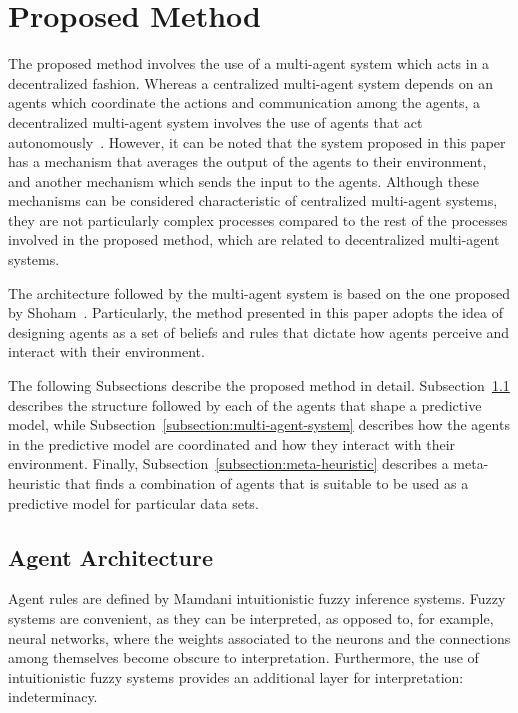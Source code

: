 \documentclass{ieeeaccess}
\begin{document}

\section{Proposed Method}
\label{section:proposed-method}

The proposed method involves the use of a multi-agent system which acts in a
decentralized fashion. Whereas a centralized multi-agent system depends on an
agents which coordinate the actions and communication among the agents, a
decentralized multi-agent system involves the use of agents that act
autonomously~\cite{andreadis2014classification}. However, it can be noted that
the system proposed in this paper has a mechanism that averages the output of
the agents to their environment, and another mechanism which sends the input to
the agents. Although these mechanisms can be considered characteristic of
centralized multi-agent systems, they are not particularly complex processes
compared to the rest of the processes involved in the proposed method, which are
related to decentralized multi-agent systems.

The architecture followed by the multi-agent system is based on the one proposed
by Shoham~\cite{Shoham1993}. Particularly, the method presented in this paper
adopts the idea of designing agents as a set of beliefs and rules that dictate
how agents perceive and interact with their environment.

The following Subsections describe the proposed method in
detail. Subsection~\ref{subsection:agent-architecture} describes the structure
followed by each of the agents that shape a predictive model, while
Subsection~\ref{subsection:multi-agent-system} describes how the agents in the
predictive model are coordinated and how they interact with their
environment. Finally, Subsection~\ref{subsection:meta-heuristic} describes a
meta-heuristic that finds a combination of agents that is suitable to be used
as a predictive model for particular data sets.

\subsection{Agent Architecture}
\label{subsection:agent-architecture}

Agent rules are defined by Mamdani intuitionistic fuzzy inference systems. Fuzzy systems
are convenient, as they can be interpreted, as opposed to, for example, neural
networks, where the weights associated to the neurons and the connections among
themselves become obscure to interpretation. Furthermore, the use of
intuitionistic fuzzy systems provides an additional layer for interpretation:
indeterminacy.
\end{document}
